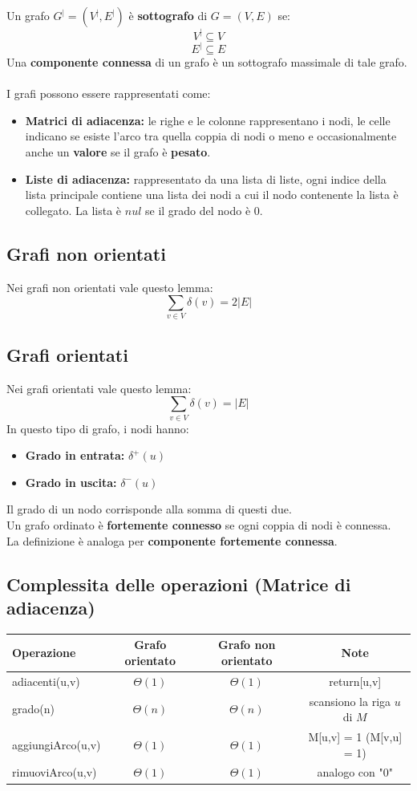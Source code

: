 \documentclass[a4paper,12pt]{article}
\begin{document}
Un grafo $G^| = (V^|,E^|)$ è \textbf{sottografo} di $G = (V,E)$ se:
\[
V^| \subseteq V
\]
\[
E^| \subseteq E
\]
Una \textbf{componente connessa} di un grafo è un sottografo massimale di tale grafo.\\\\
I grafi possono essere rappresentati come:
\begin{itemize}
    \item \textbf{Matrici di adiacenza:} le righe e le colonne rappresentano i nodi, le celle indicano se esiste l'arco tra quella coppia di nodi o meno e occasionalmente anche un \textbf{valore} se il grafo è \textbf{pesato}.
    \item \textbf{Liste di adiacenza:} rappresentato da una lista di liste, ogni indice della lista principale contiene una lista dei nodi a cui il nodo contenente la lista è collegato. La lista è $nul$ se il grado del nodo è $0$.
\end{itemize}

\subsection{Grafi non orientati}
Nei grafi non orientati vale questo lemma:
\[
\sum_{v \in V} \delta(v) = 2|E|
\]
\subsection{Grafi orientati}
Nei grafi orientati vale questo lemma:
\[
\sum_{v \in V} \delta(v) = |E|
\]
In questo tipo di grafo, i nodi hanno:
\begin{itemize}
    \item \textbf{Grado in entrata:} $\delta^+(u)$
    \item \textbf{Grado in uscita:} $\delta^-(u)$
\end{itemize}
Il grado di un nodo corrisponde alla somma di questi due.\\
Un grafo ordinato è \textbf{fortemente connesso} se ogni coppia di nodi è connessa.\\
La definizione è analoga per \textbf{componente fortemente connessa}.

\subsection{Complessita delle operazioni (Matrice di adiacenza)}
\begin{center}
\begin{tabular}{|l|c|c|c|}
\hline
Operazione & Grafo orientato & Grafo non orientato & Note\\
\hline
adiacenti(u,v) & $\Theta(1)$ & $\Theta(1)$ & return[u,v]\\
grado(n) & $\Theta(n)$ & $\Theta(n)$ & scansiono la riga $u$ di $M$\\
aggiungiArco(u,v) & $\Theta(1)$ & $\Theta(1)$ & M[u,v] = 1 (M[v,u] = 1)\\
rimuoviArco(u,v) & $\Theta(1)$ & $\Theta(1)$ & analogo con "0"\\
\hline
\end{tabular}
\end{center}
\end{document}
